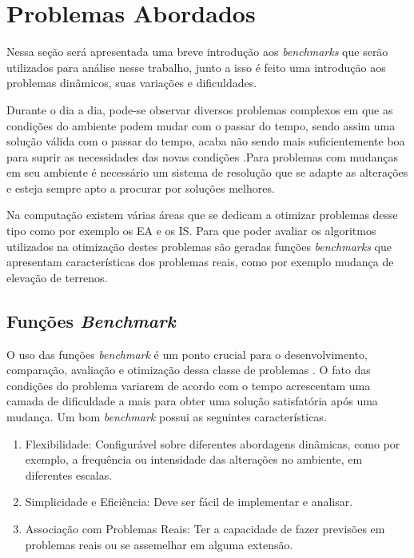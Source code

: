 \chapter{Problemas Abordados}
\label{ch:problemas}
Nessa seção será apresentada uma breve introdução aos \textit{benchmarks} que serão utilizados para análise nesse trabalho, junto a isso é feito uma introdução aos problemas dinâmicos, suas variações e dificuldades.

Durante o dia a dia, pode-se observar diversos problemas complexos em que as condições do ambiente podem mudar com o passar do tempo, sendo assim uma solução válida com o passar do tempo, acaba não sendo mais suficientemente boa para suprir as necessidades das novas condições \cite{branke2012evolutionary}.Para problemas com mudanças em seu ambiente é necessário um sistema de resolução que se adapte as alterações e esteja sempre apto a procurar por soluções melhores.

Na computação existem várias áreas que se dedicam a otimizar problemas desse tipo como por exemplo os EA e os IS. Para que poder avaliar os algoritmos utilizados na otimização destes problemas são geradas funções \textit{benchmarks} que apresentam características dos problemas reais, como por exemplo mudança de elevação de terrenos.

\section{Funções \textit{Benchmark}}
\label{sec:revisao_benchmark}
O uso das funções \textit{benchmark} é um ponto crucial para o desenvolvimento, comparação, avaliação e otimização dessa classe de problemas \cite{evolution_dynamic}. O fato das condições do problema variarem de acordo com o tempo acrescentam uma camada de dificuldade a mais para obter uma solução satisfatória após uma mudança. Um bom \textit{benchmark} possui as seguintes características.

\begin{enumerate}  
\item Flexibilidade: Configurável sobre diferentes abordagens dinâmicas, como por exemplo, a frequência ou intensidade das alterações no ambiente, em diferentes escalas.

\item Simplicidade e Eficiência: Deve ser fácil de implementar e analisar.

\item Associação com Problemas Reais: Ter a capacidade de fazer previsões em problemas reais ou se assemelhar em alguma extensão.
\end{enumerate}

